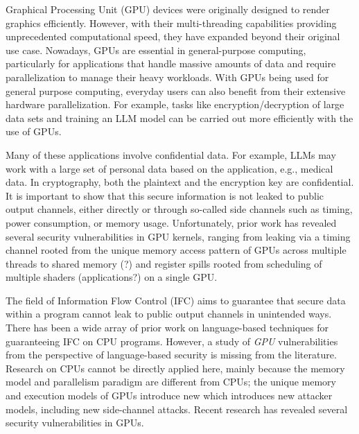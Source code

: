 Graphical Processing Unit (GPU) devices were originally designed to render graphics efficiently.
%
However, with their multi-threading capabilities providing unprecedented computational speed, they have expanded beyond their original use case.
%
Nowadays, GPUs are essential in general-purpose computing, particularly for applications that handle massive amounts of data and require parallelization to manage their heavy workloads.
%
%
With GPUs being used for general purpose computing, everyday users can also benefit from their extensive hardware parallelization.
%
For example, tasks like encryption/decryption of large data sets and training an LLM model can be carried out more efficiently with the use of GPUs.

Many of these applications involve confidential data. 
%
For example, LLMs may work with a large set of personal data based on the application, e.g., medical data.
%
In cryptography, both the plaintext and the encryption key are confidential.
%
%
It is important to show that this secure information is not leaked to public output channels, either directly or through so-called side channels such as timing, power consumption, or memory usage.
%
Unfortunately, prior work has revealed several security vulnerabilities in GPU kernels, ranging from leaking via a timing channel rooted from the unique memory access pattern of GPUs across multiple threads to shared memory (?) and register spills rooted from scheduling of multiple shaders (applications?) on a single GPU.

The field of Information Flow Control (IFC) aims to guarantee that secure
data within a program cannot leak to public output channels in unintended
ways.
%
There has been a wide array of prior work on language-based techniques for
guaranteeing IFC on CPU programs.
%
However, a study of \textit{GPU} vulnerabilities from the perspective of language-based security is missing from the literature.
%
Research on CPUs cannot be directly applied here, mainly because the memory model and parallelism paradigm are different from CPUs; the unique memory and execution models of GPUs introduce new which introduces new attacker models, including new side-channel attacks.
Recent research has revealed several security vulnerabilities in GPUs.
%
%

